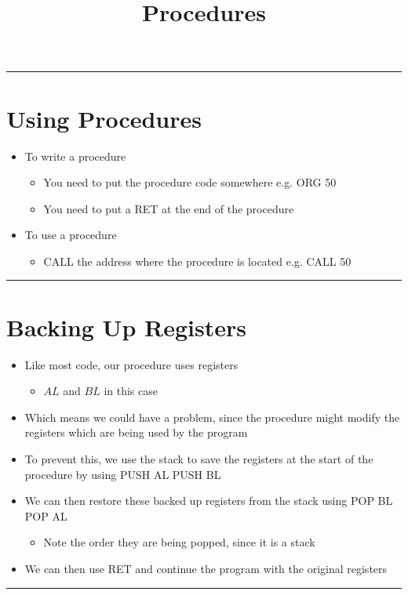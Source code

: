 \documentclass{article}
\title{Procedures}
\begin{document}
\maketitle

\begin{center}
  \rule{.5\textwidth}{0.4pt}
\end{center}

\section{Using Procedures}
\begin{itemize}
  \item{To write a procedure}
  \begin{itemize}
    \item{You need to put the procedure code somewhere e.g. ORG 50}
    \item{You need to put a RET at the end of the procedure}
  \end{itemize}
  \item{To use a procedure}
  \begin{itemize}
    \item{CALL the address where the procedure is located e.g. CALL 50}
  \end{itemize}
\end{itemize}

\begin{center}
  \rule{.5\textwidth}{0.4pt}
\end{center}

\section{Backing Up Registers}
\begin{itemize}
  \item{Like most code, our procedure uses registers}
  \begin{itemize}
    \item{$AL$ and $BL$ in this case}
  \end{itemize}
  \item{Which means we could have a problem, since the procedure might modify the registers which are being used by the program}
  \item{To prevent this, we use the stack to save the registers at the start of the procedure by using PUSH AL PUSH BL}
  \item{We can then restore these backed up registers from the stack using POP BL POP AL}
  \begin{itemize}
    \item{Note the order they are being popped, since it is a stack}
  \end{itemize}
  \item{We can then use RET and continue the program with the original registers}
\end{itemize}

\begin{center}
  \rule{.5\textwidth}{0.4pt}
\end{center}
\end{document}
